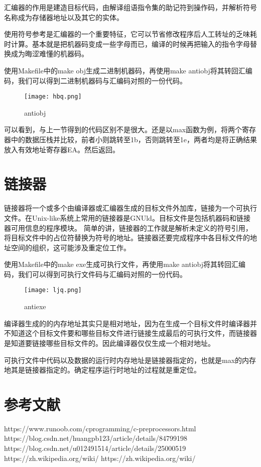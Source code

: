 \documentclass[lang=cn,11pt,a4paper,cite=authoryear]{elegantpaper}
\begin{document}
汇编器的作用是建造目标代码，由解译组语指令集的助记符到操作码，并解析符号名称成为存储器地址以及其它的实体。

使用符号参考是汇编器的一个重要特征，它可以节省修改程序后人工转址的乏味耗时计算。基本就是把机器码变成一些字母而已，编译的时候再把输入的指令字母替换成为晦涩难懂的机器码。

使用Makefile中的make obj生成二进制机器码，再使用make antiobj将其转回汇编码，我们可以得到二进制机器码与汇编码对照的一份代码。

\begin{figure}[htbp]
  \centering
  \texttt{[image: hbq.png]}
  \caption{antiobj}
\end{figure}

可以看到，与上一节得到的代码区别不是很大。还是以max函数为例，将两个寄存器中的数据压栈并比较，前者小则跳转至1b，否则跳转至1e，两者均是将正确结果放入有效地址寄存器EA。然后返回。

\section{链接器}

链接器将一个或多个由编译器或汇编器生成的目标文件外加库，链接为一个可执行文件。在Unix-like系统上常用的链接器是GNUld。目标文件是包括机器码和链接器可用信息的程序模块。
简单的讲，链接器的工作就是解析未定义的符号引用，将目标文件中的占位符替换为符号的地址。链接器还要完成程序中各目标文件的地址空间的组织，这可能涉及重定位工作。

使用Makefile中的make exe生成可执行文件，再使用make antiobj将其转回汇编码，我们可以得到可执行文件码与汇编码对照的一份代码。

\clearpage

\begin{figure}[htbp]
  \centering
  \texttt{[image: ljq.png]}
  \caption{antiexe}
\end{figure}

编译器生成的的内存地址其实只是相对地址，因为在生成一个目标文件时编译器并不知道这个目标文件要和哪些目标文件进行链接生成最后的可执行文件，而链接器是知道要链接哪些目标文件的。因此编译器仅仅生成一个相对地址。

可执行文件中代码以及数据的运行时内存地址是链接器指定的，也就是max的内存地其是链接器指定的。确定程序运行时地址的过程就是重定位。


\section{参考文献}
https://www.runoob.com/cprogramming/c-preprocessors.html
https://blog.csdn.net/huangpb123/article/details/84799198
https://blog.csdn.net/u012491514/article/details/25000519
https://zh.wikipedia.org/wiki/%
https://zh.wikipedia.org/wiki/%
\end{document}
